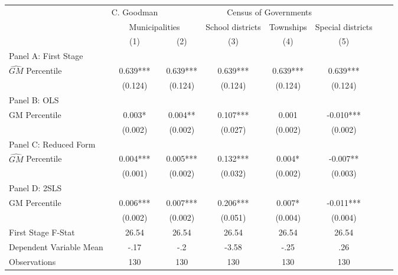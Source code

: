    \begin{tabular}{l*{7}{c}} \toprule
&\multicolumn{1}{c}{C. Goodman}&\multicolumn{4}{c}{Census of Governments}\\\cmidrule(lr){2-2}\cmidrule(lr){3-6}
&\multicolumn{2}{c}{Municipalities}&\multicolumn{1}{c}{School districts}&\multicolumn{1}{c}{Townships}&\multicolumn{1}{c}{Special districts}\\\cmidrule(lr){2-3}\cmidrule(lr){4-6}
&\multicolumn{1}{c}{(1)}&\multicolumn{1}{c}{(2)}&\multicolumn{1}{c}{(3)}&\multicolumn{1}{c}{(4)}&\multicolumn{1}{c}{(5)}\\
\cmidrule(lr){1-6}
\multicolumn{5}{l}{Panel A: First Stage}\\
\cmidrule(lr){1-6}
$\widehat{GM}$ Percentile&    0.639***&    0.639***&    0.639***&    0.639***&    0.639***\\
                &  (0.124)   &  (0.124)   &  (0.124)   &  (0.124)   &  (0.124)   \\
\cmidrule(lr){1-6}
\multicolumn{5}{l}{Panel B: OLS}\\
\cmidrule(lr){1-6}
GM Percentile   &    0.003*  &    0.004** &    0.107***&    0.001   &   -0.010***\\
                &  (0.002)   &  (0.002)   &  (0.027)   &  (0.002)   &  (0.002)   \\
\cmidrule(lr){1-6}
\multicolumn{5}{l}{Panel C: Reduced Form}\\
\cmidrule(lr){1-6}
$\widehat{GM}$ Percentile&    0.004***&    0.005***&    0.132***&    0.004*  &   -0.007** \\
                &  (0.001)   &  (0.002)   &  (0.032)   &  (0.002)   &  (0.003)   \\
\cmidrule(lr){1-6}
\multicolumn{5}{l}{Panel D: 2SLS}\\
\cmidrule(lr){1-6}
GM Percentile   &    0.006***&    0.007***&    0.206***&    0.007*  &   -0.011***\\
                &  (0.002)   &  (0.002)   &  (0.051)   &  (0.004)   &  (0.004)   \\
\midrule
First Stage F-Stat&    26.54   &    26.54   &    26.54   &    26.54   &    26.54   \\
Dependent Variable Mean&     -.17   &      -.2   &    -3.58   &     -.25   &      .26   \\
Observations    &      130   &      130   &      130   &      130   &      130   \\
       \bottomrule \end{tabular}

